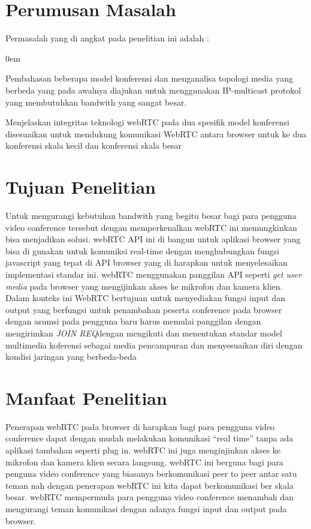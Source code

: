 \documentclass{jtetiproposalskripsi}
\begin{document}
\section{Perumusan Masalah}
Permasalah yang di angkat pada penelitian ini adalah :
\vspace{-0.5cm}
\begin{enumerate}[1.]
\begin{singlespace}
\itemsep0em
\item Pembahasan beberapa model konferensi dan menganalisa topologi media yang berbeda yang pada awalnya diajukan untuk menggunakan IP-multicast protokol yang membutuhkan bandwith yang sangat besar.
\item Menjelaskan integritas teknologi webRTC pada dua spesifik model konferensi disesuaikan untuk mendukung komunikasi WebRTC antara browser untuk ke dua konferensi skala kecil dan konferensi skala besar 
\end{singlespace}
\end{enumerate}


\section{Tujuan Penelitian}
Untuk mengurangi kebutuhan bandwith yang begitu besar bagi para pengguna video conference tersebut dengan memperkenalkan webRTC ini memungkinkan bisa menjadikan solusi. webRTC API ini di bangun untuk aplikasi browser yang bisa di gunakan untuk komuniksi real-time dengan menghubungkan fungsi javascript yang tepat di API browser yang di harapkan untuk menyelesaikan implementasi standar ini. webRTC menggunakan panggilan API seperti \emph{get user media} pada browser yang mengijinkan akses ke mikrofon dan kamera klien. Dalam konteks ini WebRTC bertujuan untuk menyediakan fungsi input dan output yang berfungsi untuk penambahan peserta conference pada browser dengan asumsi pada pengguna baru harus memulai panggilan dengan mengirimkan \emph{JOIN REQ}dengan mengikuti dan menentukan standar model multimedia koferensi sebagai media pencampuran dan menyesuaikan diri dengan kondisi jaringan yang berbeda-beda 
\section{Manfaat Penelitian}
Penerapan webRTC pada browser di harapkan bagi para pengguna video conference dapat dengan mudah melakukan komunikasi “real time” tanpa ada aplikasi tambahan seperti plug in. webRTC ini juga menginjinkan akses ke mikrofon dan kamera klien secara langsung. webRTC ini berguna bagi para penguna video conference yang biasanya berkomunikasi peer to peer antar satu teman nah dengan penerapan webRTC ini kita dapat berkomunikasi ber skala besar. webRTC mempermuda para pengguna video conference menambah dan mengurangi teman komunikasi dengan adanya fungsi input dan output pada browser.
\end{document}
